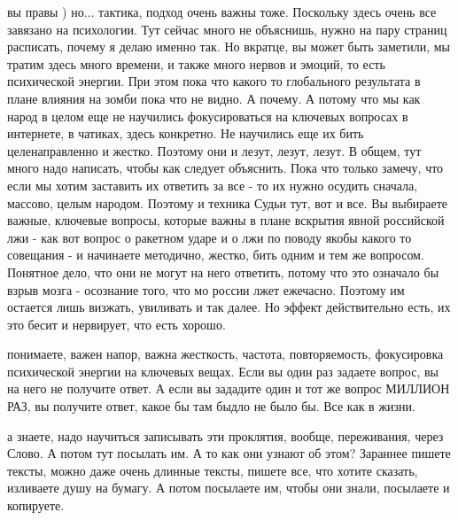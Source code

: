 вы правы ) но... тактика, подход очень важны тоже. Поскольку здесь очень все
завязано на психологии. Тут сейчас много не объяснишь, нужно на пару страниц
расписать, почему я делаю именно так. Но вкратце, вы может быть заметили, мы
тратим здесь много времени, и также много нервов и эмоций, то есть психической
энергии. При этом пока что какого то глобального результата в плане влияния на
зомби пока что не видно. А почему. А потому что мы как народ в целом еще не
научились фокусироваться на ключевых вопросах в интернете, в чатиках, здесь
конкретно. Не научились еще их бить целенаправленно и жестко. Поэтому они и
лезут, лезут, лезут. В общем, тут много надо написать, чтобы как следует
объяснить. Пока что только замечу, что если мы хотим заставить их ответить за
все - то их нужно осудить сначала, массово, целым народом. Поэтому и техника
Судьи тут, вот и все. Вы выбираете важные, ключевые вопросы, которые важны в
плане вскрытия явной российской лжи - как вот вопрос о ракетном ударе и о лжи
по поводу якобы какого то совещания - и начинаете методично, жестко, бить одним
и тем же вопросом. Понятное дело, что они не могут на него ответить, потому что
это означало бы взрыв мозга - осознание того, что мо россии лжет ежечасно.
Поэтому им остается лишь визжать, увиливать и так далее. Но эффект
действительно есть, их это бесит и нервирует, что есть хорошо.

понимаете, важен напор, важна жесткость, частота, повторяемость, фокусировка
психической энергии на ключевых вещах. Если вы один раз задаете вопрос, вы на
него не получите ответ. А если вы зададите один и тот же вопрос МИЛЛИОН РАЗ, вы
получите ответ, какое бы там быдло не было бы. Все как в жизни.

а знаете, надо научиться записывать эти проклятия, вообще, переживания, через
Слово. А потом тут посылать им. А то как они узнают об этом? Зараннее пишете
тексты, можно даже очень длинные тексты, пишете все, что хотите сказать,
изливаете душу на бумагу. А потом посылаете им, чтобы они знали, посылаете и
копируете.
